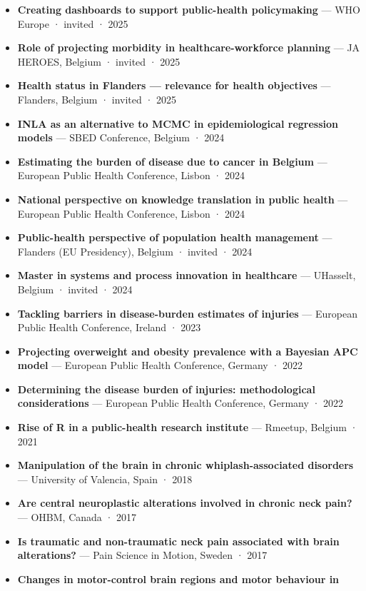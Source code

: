 \documentclass[
  letterpaper,
  DIV=11,
  numbers=noendperiod]{scrartcl}
\providecommand{\tightlist}{%
  \setlength{\itemsep}{0pt}\setlength{\parskip}{0pt}}\usepackage{longtable,booktabs,array}
\begin{document}
\begin{itemize}
\tightlist
\item
  \textbf{Creating dashboards to support public-health policymaking} ---
  WHO Europe · invited · 2025
\item
  \textbf{Role of projecting morbidity in healthcare-workforce planning}
  --- JA HEROES, Belgium · invited · 2025
\item
  \textbf{Health status in Flanders --- relevance for health objectives}
  --- Flanders, Belgium · invited · 2025
\item
  \textbf{INLA as an alternative to MCMC in epidemiological regression
  models} --- SBED Conference, Belgium · 2024
\item
  \textbf{Estimating the burden of disease due to cancer in Belgium} ---
  European Public Health Conference, Lisbon · 2024
\item
  \textbf{National perspective on knowledge translation in public
  health} --- European Public Health Conference, Lisbon · 2024
\item
  \textbf{Public-health perspective of population health management} ---
  Flanders (EU Presidency), Belgium · invited · 2024
\item
  \textbf{Master in systems and process innovation in healthcare} ---
  UHasselt, Belgium · invited · 2024
\item
  \textbf{Tackling barriers in disease-burden estimates of injuries} ---
  European Public Health Conference, Ireland · 2023
\item
  \textbf{Projecting overweight and obesity prevalence with a Bayesian
  APC model} --- European Public Health Conference, Germany · 2022
\item
  \textbf{Determining the disease burden of injuries: methodological
  considerations} --- European Public Health Conference, Germany · 2022
\item
  \textbf{Rise of R in a public-health research institute} --- Rmeetup,
  Belgium · 2021
\item
  \textbf{Manipulation of the brain in chronic whiplash-associated
  disorders} --- University of Valencia, Spain · 2018
\item
  \textbf{Are central neuroplastic alterations involved in chronic neck
  pain?} --- OHBM, Canada · 2017
\item
  \textbf{Is traumatic and non-traumatic neck pain associated with brain
  alterations?} --- Pain Science in Motion, Sweden · 2017
\item
  \textbf{Changes in motor-control brain regions and motor behaviour in
}
\end{itemize}
\end{document}
